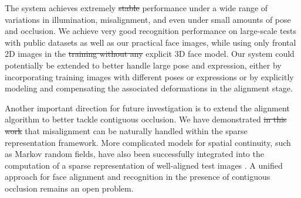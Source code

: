 \documentclass[12pt,journal,draftcls,letterpaper,onecolumn]{IEEEtran}
\providecommand{\DIFadd}[1]{{\protect\color{blue}\uwave{#1}}} %
\providecommand{\DIFdel}[1]{{\protect\color{red}\sout{#1}}}                      %
\providecommand{\DIFaddbegin}{} %
\providecommand{\DIFaddend}{} %
\providecommand{\DIFdelbegin}{} %
\providecommand{\DIFdelend}{} %
\begin{document}
\DIFaddend The system achieves extremely \DIFdelbegin %
\DIFdel{stable }%
\DIFdelend \DIFaddbegin \DIFadd{stable }\DIFaddend performance under
a wide range of variations in illumination, misalignment, and even under small amounts of
pose and occlusion. We achieve very good recognition performance on
large-scale tests with public datasets as well as our practical face
images, while using only frontal 2D images in the \DIFdelbegin \DIFdel{training without
any }\DIFdelend \DIFaddbegin \DIFadd{gallery and no
}\DIFaddend explicit 3D face model.
Our system could potentially be extended to better handle large pose
and expression, either by incorporating training images with different poses or
expressions or by explicitly modeling and compensating the associated deformations
in the alignment stage.

Another important direction for future
investigation is to extend the alignment algorithm to better
tackle contiguous occlusion. We have demonstrated \DIFdelbegin \DIFdel{in this
work }\DIFdelend that misalignment can be naturally handled within the
sparse representation framework. More complicated models for
spatial continuity, such as Markov random fields, have also
been successfully integrated into the computation of a sparse
representation of well-aligned test images
\cite{Cevher2008-NIPS, ZhouZ2009}. A unified approach
for face alignment and recognition in the presence of
contiguous occlusion remains an open problem.
\DIFdelbegin %
\DIFdelend 

\end{document}
